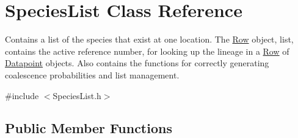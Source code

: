 \hypertarget{class_species_list}{}\section{Species\+List Class Reference}
\label{class_species_list}


Contains a list of the species that exist at one location. The \hyperlink{class_row}{Row} object, list, contains the active reference number, for looking up the lineage in a \hyperlink{class_row}{Row} of \hyperlink{class_datapoint}{Datapoint} objects. Also contains the functions for correctly generating coalescence probabilities and list management.  




{\ttfamily \#include $<$Species\+List.\+h$>$}

\subsection*{Public Member Functions}
